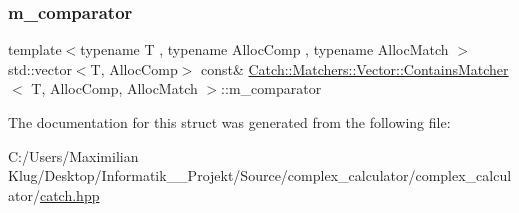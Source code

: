 \subsubsection{\texorpdfstring{m\+\_\+comparator}{m\_comparator}}
{\footnotesize\ttfamily template$<$typename T , typename Alloc\+Comp , typename Alloc\+Match $>$ \\
std\+::vector$<$T, Alloc\+Comp$>$ const\& \mbox{\hyperlink{struct_catch_1_1_matchers_1_1_vector_1_1_contains_matcher}{Catch\+::\+Matchers\+::\+Vector\+::\+Contains\+Matcher}}$<$ T, Alloc\+Comp, Alloc\+Match $>$\+::m\+\_\+comparator}



The documentation for this struct was generated from the following file\+:\begin{DoxyCompactItemize}
\item 
C\+:/\+Users/\+Maximilian Klug/\+Desktop/\+Informatik\+\_\+\_\+\+Projekt/\+Source/complex\+\_\+calculator/complex\+\_\+calculator/\mbox{\hyperlink{catch_8hpp}{catch.\+hpp}}\end{DoxyCompactItemize}
